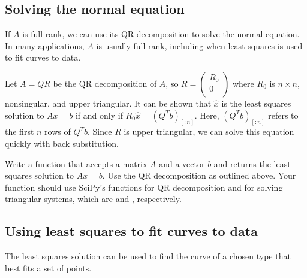 \subsection*{Solving the normal equation}
If $A$ is full rank, we can use its QR decomposition to solve the normal equation. 
In many applications, $A$ is usually full rank, including when least squares is used to fit curves to data.

Let $A=QR$ be the QR decomposition of $A$, so $R = \left(\begin{array}{c}R_0\\
0\\ \end{array} \right)$
where $R_0$ is $n \times n$, nonsingular, and upper triangular. 
It can be shown that $\widehat{x}$ is the least squares solution to $Ax=b$ if and only if $R_0\widehat{x} = (Q^Tb)_{[:n]}.$ 
Here, $(Q^Tb)_{[:n]}$ refers to the first $n$ rows of $Q^Tb$.
Since $R$ is upper triangular, we can solve this equation quickly with back substitution. 


\begin{problem}
Write a function that accepts a matrix $A$ and a vector $b$ and returns the least squares solution to $Ax=b$.
Use the QR decomposition as outlined above.
Your function should use SciPy's functions for QR decomposition and for solving triangular systems, which are  and , respectively.
\end{problem}

\subsection*{Using least squares to fit curves to data}
The least squares solution can be used to find the curve of a chosen type that best fits a set of points. 

